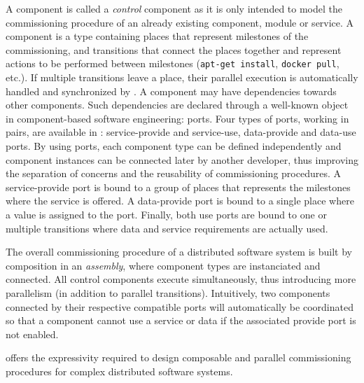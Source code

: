 A \mad component is called a \emph{control} component as it is only
intended to model the commissioning procedure of an already existing
component, module or service. A \mad component is a type containing
places that represent milestones of the commissioning, and transitions
that connect the places together and represent actions to be performed
between milestones (\eg \texttt{apt-get install}, \texttt{docker pull},
etc.). If multiple transitions leave a place, their parallel execution
is automatically handled and synchronized by \mad. A component may
have dependencies towards other components. Such dependencies are declared
through a well-known object in component-based software engineering:
ports. Four types of ports, working in pairs, are available in \mad:
service-provide and service-use, data-provide and data-use ports. By
using ports, each component type can be defined independently and
component instances can be connected later by another developer, thus
improving the separation of concerns and the reusability of commissioning
procedures. A service-provide port is bound to a group of places that
represents the milestones where the service is offered. A data-provide
port is bound to a single place where a value is assigned to the
port. Finally, both use ports are bound to one or multiple transitions
where data and service requirements are actually used.

The overall commissioning procedure of a distributed software system
is built by composition in an \emph{assembly}, where component
types are instanciated and connected. All control components execute
simultaneously, thus introducing more parallelism (in addition to
parallel transitions). Intuitively, two components connected by their
respective compatible ports will automatically be coordinated so
that a component cannot use a service or data if the associated
provide port is not enabled.

\mad offers the expressivity required to design composable and parallel
commissioning procedures for complex distributed software systems.

